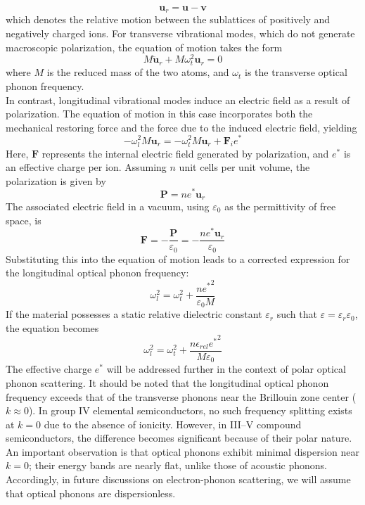 \begin{equation}
	\mathbf{u}_r = \mathbf{u} - \mathbf{v}
\end{equation}
which denotes the relative motion between the sublattices of positively and negatively charged ions. For transverse vibrational modes, which do not generate macroscopic polarization, the equation of motion takes the form
\begin{equation}
	M \ddot{\mathbf{u}}_r + M \omega_t^2 \mathbf{u}_r = 0
\end{equation}
where $M$ is the reduced mass of the two atoms, and $\omega_t$ is the transverse optical phonon frequency.\\
In contrast, longitudinal vibrational modes induce an electric field as a result of polarization. The equation of motion in this case incorporates both the mechanical restoring force and the force due to the induced electric field, yielding
\begin{equation}
	- \omega_l^2 M \mathbf{u}_r = - \omega_t^2 M \mathbf{u}_r + \mathbf{F}_i e^*
\end{equation}
Here, $\mathbf{F}$ represents the internal electric field generated by polarization, and $e^*$ is an effective charge per ion. Assuming $n$ unit cells per unit volume, the polarization is given by
\begin{equation}
	\mathbf{P} = n e^* \mathbf{u}_r
\end{equation}
The associated electric field in a vacuum, using $\varepsilon_0$ as the permittivity of free space, is
\begin{equation}
	\mathbf{F} = -\frac{\mathbf{P}}{\varepsilon_0} = -\frac{n e^* \mathbf{u}_r}{\varepsilon_0}
\end{equation}
Substituting this into the equation of motion leads to a corrected expression for the longitudinal optical phonon frequency:
\begin{equation}
	\omega_l^2 = \omega_t^2 + \frac{n {e^*}^2}{\varepsilon_0 M}
\end{equation}
If the material possesses a static relative dielectric constant $\varepsilon_r$ such that $\varepsilon = \varepsilon_r \varepsilon_0$, the equation becomes
\begin{equation}
	\omega_l^2 = \omega_t^2 + \frac{n \epsilon_{rel} {e^*}^2}{M \varepsilon_0}
\end{equation}
The effective charge $e^*$ will be addressed further in the context of polar optical phonon scattering. It should be noted that the longitudinal optical phonon frequency exceeds that of the transverse phonons near the Brillouin zone center ($k \approx 0$). In group IV elemental semiconductors, no such frequency splitting exists at $k = 0$ due to the absence of ionicity. However, in III–V compound semiconductors, the difference becomes significant because of their polar nature.\\
An important observation is that optical phonons exhibit minimal dispersion near $k = 0$; their energy bands are nearly flat, unlike those of acoustic phonons. Accordingly, in future discussions on electron-phonon scattering, we will assume that optical phonons are dispersionless.

